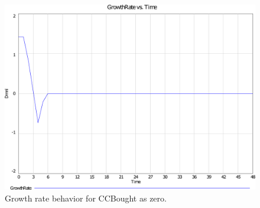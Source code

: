         \begin{figure}[H]
        	\centering
            \includegraphics[scale=0.3]{files/ExtrCCBoughtGrowth.pdf}
            \caption{Growth rate behavior for CCBought as zero.}
            \label{img:extrgrowth}
        \end{figure}
        
